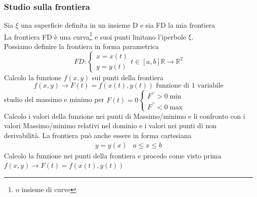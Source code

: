 \subsubsection{Studio sulla frontiera}
Sia $\xi$ una superficie definita in un insieme D e sia FD la mia frontiera\\
La frontiera FD è una curva\footnote{o insieme di curve} e suoi punti linitano
l'iperbole $\xi$.\\
Possiamo definire la frontiera in forma parametrica
\begin{equation*}
	FD:\begin{cases}
		x=x(t)\\
		y=y(t)
	\end{cases} t\in [a,b] \mathds{R}\to \mathds{R}^2
\end{equation*}
Calcolo la funzione $f(x,y)$ sui punti della frontiera
\begin{equation}
	f(x,y)\to F(t)=f(x(t),y(t))\text{ funzione di 1 variabile}
\end{equation}
studio del massimo e minimo per $F(t)=0\begin{cases}
	F^{\prime\prime}>0 \min\\
	F^{\prime\prime}<0 \max
\end{cases}$\\
Calcolo i valori della funzione nei punti di Massimo/minimo e li confronto con
i valori Massimo/minimo relativi nel dominio e i valori nei punti di non
derivabilità. La frontiera può anche essere in forma cartesiana
\begin{equation}
	\begin{matrix}
		y=y(x) & a\leq x\leq b
	\end{matrix}
\end{equation}
Calcolo la funzione nei punti della frontiera e procedo come visto prima
$f(x,y)\to F(t)=f(x(t),y(t))$

